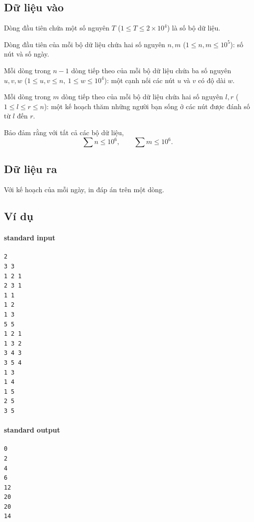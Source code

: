 \documentclass[11pt]{article}
\begin{document}
\subsection*{Dữ liệu vào}

Dòng đầu tiên chứa một số nguyên \(T\) (\(1\le T\le 2\times 10^4\)) là số bộ
dữ liệu.

Dòng đầu tiên của mỗi bộ dữ liệu chứa hai số nguyên \(n,m\)
(\(1\le n,m\le 10^5\)): số nút và số ngày.

Mỗi dòng trong \(n-1\) dòng tiếp theo của mỗi bộ dữ liệu chứa ba số nguyên
\(u,v,w\) (\(1\le u,v\le n,\ 1\le w\le 10^4\)): một cạnh nối các nút \(u\) và
\(v\) có độ dài \(w\).

Mỗi dòng trong \(m\) dòng tiếp theo của mỗi bộ dữ liệu chứa hai số nguyên
\(l,r\) (\(1\le l\le r\le n\)): một kế hoạch thăm những người bạn sống ở các
nút được đánh số từ \(l\) đến \(r\).

Bảo đảm rằng với tất cả các bộ dữ liệu,
\[
  \sum n\le 10^6,\qquad
  \sum m\le 10^6.
\]

\subsection*{Dữ liệu ra}

Với kế hoạch của mỗi ngày, in đáp án trên một dòng.

\subsection*{Ví dụ}

\paragraph{standard input}
\begin{verbatim}
2
3 3
1 2 1
2 3 1
1 1
1 2
1 3
5 5
1 2 1
1 3 2
3 4 3
3 5 4
1 3
1 4
1 5
2 5
3 5
\end{verbatim}

\paragraph{standard output}
\begin{verbatim}
0
2
4
6
12
20
20
14
\end{verbatim}
\end{document}
